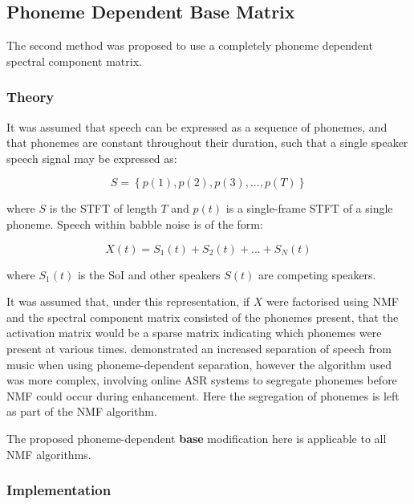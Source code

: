 \subsection{\label{sub:Phoneme-Base}Phoneme Dependent Base Matrix}

The second method was proposed to use a completely phoneme dependent
spectral component matrix.


\subsubsection*{Theory}

It was assumed that speech can be expressed as a sequence of phonemes,
and that phonemes are constant throughout their duration, such that
a single speaker speech signal may be expressed as:

\[
S=\left\{ p\left(1\right),p\left(2\right),p\left(3\right),...,p\left(T\right)\right\} 
\]



where $S$ is the \ac{STFT} of length $T$ and $p\left(t\right)$
is a single-frame \ac{STFT} of a single phoneme. Speech within babble
noise is of the form:

\[
X\left(t\right)=S_{1}\left(t\right)+S_{2}\left(t\right)+...+S_{N}\left(t\right)
\]


where $S_{1}\left(t\right)$ is the \ac{SoI} and other speakers $S\left(t\right)$
are competing speakers.

It was assumed that, under this representation, if $X$ were factorised
using \ac{NMF} and the spectral component matrix consisted of the
phonemes present, that the activation matrix would be a sparse matrix
indicating which phonemes were present at various times. \citet{Raj2011}
demonstrated an increased separation of speech from music when using
phoneme-dependent separation, however the algorithm used was more
complex, involving online \ac{ASR} systems to segregate phonemes
before \ac{NMF} could occur during enhancement. Here the segregation
of phonemes is left as part of the \ac{NMF} algorithm.

The proposed phoneme-dependent\textbf{ base} modification here is
applicable to all \ac{NMF} algorithms.


\subsubsection*{Implementation}

